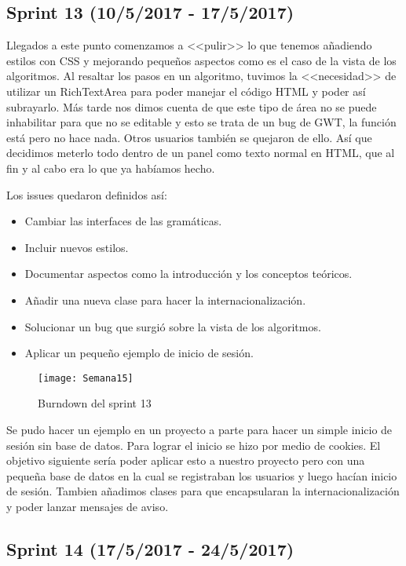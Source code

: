 \subsection{Sprint 13 (10/5/2017 - 17/5/2017)}

Llegados a este punto comenzamos a <<pulir>> lo que tenemos añadiendo estilos con CSS y mejorando pequeños aspectos como es el caso de la vista de los algoritmos. Al resaltar los pasos en un algoritmo, tuvimos la <<necesidad>> de utilizar un RichTextArea para poder manejar el código HTML y poder así subrayarlo. Más tarde nos dimos cuenta de que este tipo de área no se puede inhabilitar para que no se editable y esto se trata de un bug de GWT, la función está pero no hace nada. Otros usuarios también se quejaron de ello. Así que decidimos meterlo todo dentro de un panel como texto normal en HTML, que al fin y al cabo era lo que ya habíamos hecho.

Los issues quedaron definidos así:
\begin{itemize}
\item Cambiar las interfaces de las gramáticas.
\item Incluir nuevos estilos.
\item Documentar aspectos como la introducción y los conceptos teóricos.
\item Añadir una nueva clase para hacer la internacionalización.
\item Solucionar un bug que surgió sobre la vista de los algoritmos.
\item Aplicar un pequeño ejemplo de inicio de sesión.
\end{itemize}

\begin{figure}[h]
\centering
\texttt{[image: Semana15]}
\caption{Burndown del sprint 13}
\label{fig:A.2.6}
\end{figure}

Se pudo hacer un ejemplo en un proyecto a parte para hacer un simple inicio de sesión sin base de datos. Para lograr el inicio se hizo por medio de cookies. El objetivo siguiente sería poder aplicar esto a nuestro proyecto pero con una pequeña base de datos en la cual se registraban los usuarios y luego hacían inicio de sesión. Tambien añadimos clases para que encapsularan la internacionalización y poder lanzar mensajes de aviso.

\subsection{Sprint 14 (17/5/2017 - 24/5/2017)}

